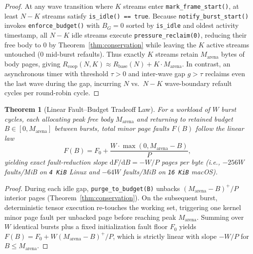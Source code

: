 \documentclass[sigconf,screen]{acmart}
\newtheorem{theorem}{Theorem}
\begin{document}
\begin{proof}
At any wave transition where $K$ streams enter \texttt{mark\_frame\_start()}, at least $N - K$ streams satisfy \texttt{is\_idle() == true}. Because \texttt{notify\_burst\_start()} invokes \texttt{enforce\_budget()} with $B_G = 0$ sorted by \texttt{is\_idle} and oldest activity timestamp, all $N-K$ idle streams execute \texttt{pressure\_reclaim(0)}, reducing their free body to $0$ by Theorem~\ref{thm:conservation} while leaving the $K$ active streams untouched ($0$ mid-burst refaults). Thus exactly $K$ streams retain $M_{\text{arena}}$ bytes of body pages, giving $R_{\text{coop}}(N, K) \approx R_{\text{base}}(N) + K \cdot M_{\text{arena}}$. In contrast, an asynchronous timer with threshold $\tau > 0$ and inter-wave gap $g > \tau$ reclaims even the last wave during the gap, incurring $N$ vs.\ $N-K$ wave-boundary refault cycles per round-robin cycle.
\end{proof}

\begin{theorem}[Linear Fault--Budget Tradeoff Law]
\label{thm:linear}
For a workload of $W$ burst cycles, each allocating peak free body $M_{\text{arena}}$ and returning to retained budget $B \in [0, M_{\text{arena}}]$ between bursts, total minor page faults $F(B)$ follow the linear law
\begin{equation}
  F(B) = F_0 + \frac{W \cdot \max(0, M_{\text{arena}} - B)}{P},
\end{equation}
yielding exact fault-reduction slope $\mathrm{d}F/\mathrm{d}B = -W/P$ pages per byte (i.e., $-256 W$ faults/MiB on \texttt{4~KiB} Linux and $-64 W$ faults/MiB on \texttt{16~KiB} macOS).
\end{theorem}

\begin{proof}
During each idle gap, \texttt{purge\_to\_budget(B)} unbacks $(M_{\text{arena}} - B)^+ / P$ interior pages (Theorem~\ref{thm:conservation}). On the subsequent burst, deterministic tensor execution re-touches the working set, triggering one kernel minor page fault per unbacked page before reaching peak $M_{\text{arena}}$. Summing over $W$ identical bursts plus a fixed initialization fault floor $F_0$ yields $F(B) = F_0 + W (M_{\text{arena}} - B)^+ / P$, which is strictly linear with slope $-W/P$ for $B \le M_{\text{arena}}$.
\end{proof}
\end{document}
